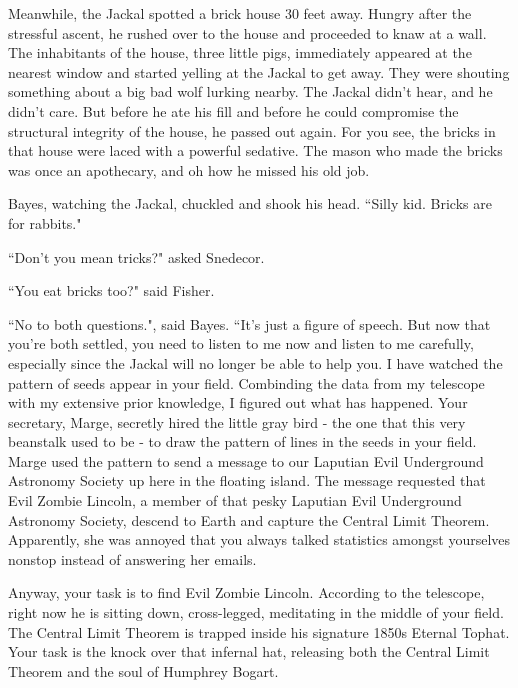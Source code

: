 \documentclass{article}
\begin{document}
Meanwhile, the Jackal spotted a brick house 30 feet away. Hungry after the stressful ascent, he rushed over to the house and proceeded to knaw at a wall. The inhabitants of the house, three little pigs, immediately appeared at the nearest window and started yelling at the Jackal to get away. They were shouting something about a big bad wolf lurking nearby. The Jackal didn't hear, and he didn't care. But before he ate his fill and before he could compromise the structural integrity of the house, he passed out again. For you see, the bricks in that house were laced with a powerful sedative. The mason who made the bricks was once an apothecary, and oh how he missed his old job. \newline

Bayes, watching the Jackal, chuckled and shook his head. ``Silly kid. Bricks are for rabbits." \newline

``Don't you mean tricks?" asked Snedecor. \newline

``You eat bricks too?" said Fisher. \newline

``No to both questions.", said Bayes. ``It's just a figure of speech. But now that you're both settled, you need to listen to me now and listen to me carefully, especially since the Jackal will no longer be able to help you. I have watched the pattern of seeds appear in your field. Combinding the data from my telescope with my extensive prior knowledge, I figured out what has happened. Your secretary, Marge, secretly hired the little gray bird - the one that this very beanstalk used to be - to draw the pattern of lines in the seeds in your field. Marge used the pattern to send a message to our Laputian Evil Underground Astronomy Society up here in the floating island. The message requested that Evil Zombie Lincoln, a member of that pesky Laputian Evil Underground Astronomy Society, descend to Earth and capture the Central Limit Theorem. Apparently, she was annoyed that you always talked statistics amongst yourselves nonstop instead of answering her emails. \newline

Anyway, your task is to find Evil Zombie Lincoln. According to the telescope, right now he is sitting down, cross-legged, meditating in the middle of your field. The Central Limit Theorem is trapped inside his signature 1850s Eternal Tophat. Your task is the knock over that infernal hat, releasing both the Central Limit Theorem and the soul of Humphrey Bogart. \newline
\end{document}
